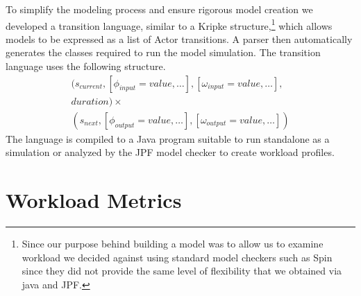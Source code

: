 \documentclass[letterpaper]{article}
\begin{document}


To simplify the modeling process and ensure rigorous model creation we
developed a transition language, similar to a Kripke structure,\footnote{Since our purpose behind building a model was to allow us to examine workload we decided against using standard model checkers such as Spin since they did not provide the same level of flexibility that we obtained via java and JPF.}  which allows
models to be expressed as a list of Actor transitions.  A parser then
automatically generates the classes required to run the model simulation.
The transition language uses the following structure.
\begin{equation}
\begin{split}
(s_{current}, [\phi_{input} = value,\ldots], [\omega_{input} = value,\ldots],\\
duration) \times \\
(s_{next}, [\phi_{output} =
value,\ldots], [\omega_{output} = value,\ldots])
\end{split}
\end{equation}
\noindent The language is compiled to a Java program suitable to run standalone
as a simulation or analyzed by the JPF model checker to create
workload profiles.

\section{Workload Metrics}
\end{document}
